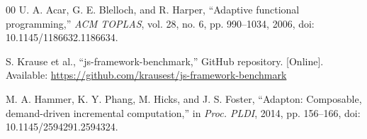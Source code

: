 \documentclass[conference]{IEEEtran}
\begin{document}
\begin{thebibliography}{00}
U. A. Acar, G. E. Blelloch, and R. Harper, ``Adaptive functional programming,''
\emph{ACM TOPLAS}, vol. 28, no. 6, pp. 990--1034, 2006,
doi: 10.1145/1186632.1186634.

S. Krause et al., ``js-framework-benchmark,'' GitHub repository. [Online].
Available: \url{https://github.com/krausest/js-framework-benchmark}

M. A. Hammer, K. Y. Phang, M. Hicks, and J. S. Foster,
``Adapton: Composable, demand-driven incremental computation,'' in
\emph{Proc. PLDI}, 2014, pp. 156--166, doi: 10.1145/2594291.2594324.

\end{thebibliography}
\end{document}
